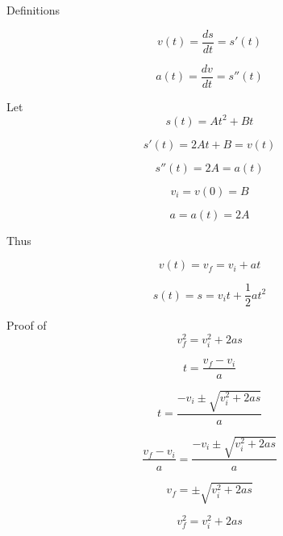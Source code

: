 \documentclass[12pt,letterpaper]{article}
\begin{document}
Definitions

$$v(t) = \dfrac{ds}{dt} = s'(t)$$

$$a(t) = \dfrac{dv}{dt} = s''(t)$$

Let $$s(t) = At^2 + Bt$$

$$s'(t) = 2At + B = v(t)$$

$$s''(t) = 2A = a(t)$$

$$v_i = v(0) = B$$

$$a = a(t) = 2A$$

Thus

$$v(t) = v_f = v_i + at$$

$$s(t) = s = v_i t + \frac{1}{2}at^2$$

Proof of $$v_f^2 = v_i^2 + 2as $$

$$t = \frac{v_f - v_i}{a}$$


$$t = \frac{-v_i \pm \sqrt{v_i^2 + 2as}}{a}$$

$$\frac{v_f - v_i}{a} = \frac{-v_i \pm \sqrt{v_i^2 + 2as}}{a}$$

$$v_f = \pm \sqrt{v_i^2 + 2as}$$

$$v_f^2 = v_i^2 + 2as$$
\end{document}
